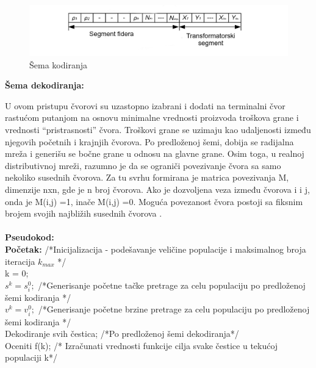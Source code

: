 \documentclass[a4paper]{article}
\begin{document}
\begin{figure}[htp]
    \centering
    \includegraphics[scale=0.3]{foto4.jpg}
    \caption{Šema kodiranja}
    \label{fig:sema_kodiranja}
\end{figure}

\begin{flushleft}
\textbf{Šema dekodiranja:} 
\end{flushleft}

U ovom pristupu čvorovi su uzastopno izabrani i dodati na terminalni čvor rastućom putanjom na osnovu minimalne vrednosti proizvoda troškova grane i vrednosti “pristrasnosti” čvora. Troškovi grane se uzimaju kao udaljenosti između njegovih početnih i krajnjih čvorova. Po predloženoj šemi, dobija se radijalna mreža i generišu se bočne grane u odnosu na glavne grane. Osim toga, u realnoj distributivnoj mreži, razumno je da se ograniči povezivanje čvora sa samo nekoliko susednih čvorova. Za tu svrhu formirana je matrica povezivanja M, dimenzije nxn, gde je n broj čvorova. Ako je dozvoljena veza između čvorova i i j, onda je M(i,j) =1, inače  M(i,j) =0. Moguća povezanost čvora postoji sa fiksnim brojem svojih najbližih susednih čvorova \cite{inproceedings}.\\
\\ 
\textbf{Pseudokod:} \\ 
\textbf{Početak:} /*Inicijalizacija - podešavanje veličine populacije i maksimalnog broja iteracija $k_{max}$ */ \\
\hspace*{5mm}k = 0; \\
\hspace*{5mm}$s^k = s_{i}^0;$  /*Generisanje početne tačke pretrage za celu populaciju po predloženoj šemi kodiranja */ \\
\hspace*{5mm}$v^k = v_{i}^0;$  /*Generisanje početne brzine pretrage za celu populaciju po predloženoj šemi kodiranja */ \\
\hspace*{5mm}Dekodiranje svih čestica; /*Po predloženoj šemi dekodiranja*/ \\
\hspace*{5mm}Oceniti f(k); /* Izračunati vrednosti funkcije cilja svake čestice u tekućoj populaciji k*/ \\
\end{document}
